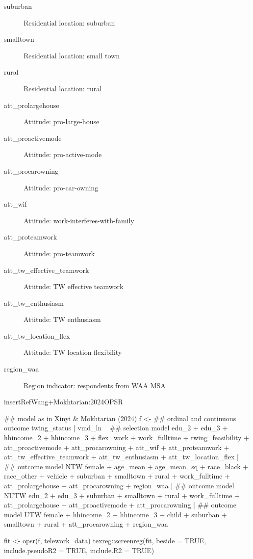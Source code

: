 \documentclass[letterpaper]{book}
\begin{document}
\begin{Format}
\begin{description}
\item[suburban] Residential location: suburban
\item[smalltown] Residential location: small town
\item[rural] Residential location: rural
\item[att\_prolargehouse] Attitude: pro-large-house
\item[att\_proactivemode] Attitude: pro-active-mode
\item[att\_procarowning] Attitude: pro-car-owning
\item[att\_wif] Attitude: work-interferes-with-family
\item[att\_proteamwork] Attitude: pro-teamwork
\item[att\_tw\_effective\_teamwork] Attitude: TW effective teamwork
\item[att\_tw\_enthusiasm] Attitude: TW enthusiasm
\item[att\_tw\_location\_flex] Attitude: TW location flexibility
\item[region\_waa] Region indicator: respondents from WAA MSA

\end{description}

\end{Format}
%
\begin{References}
\bsl{}insertRefWang+Mokhtarian:2024OPSR
\end{References}
%
\begin{Examples}
\begin{ExampleCode}


## model as in Xinyi & Mokhtarian (2024)
f <-
  ## ordinal and continuous outcome
  twing_status | vmd_ln ~
  ## selection model
  edu_2 + edu_3 + hhincome_2 + hhincome_3 +
  flex_work + work_fulltime + twing_feasibility +
  att_proactivemode + att_procarowning +
  att_wif + att_proteamwork +
  att_tw_effective_teamwork + att_tw_enthusiasm + att_tw_location_flex |
  ## outcome model NTW
  female + age_mean + age_mean_sq +
  race_black + race_other +
  vehicle + suburban + smalltown + rural +
  work_fulltime +
  att_prolargehouse + att_procarowning +
  region_waa |
  ## outcome model NUTW
  edu_2 + edu_3 + suburban + smalltown + rural +
  work_fulltime +
  att_prolargehouse + att_proactivemode + att_procarowning |
  ## outcome model UTW
  female + hhincome_2 + hhincome_3 +
  child + suburban + smalltown + rural +
  att_procarowning +
  region_waa

fit <- opsr(f, telework_data)
texreg::screenreg(fit, beside = TRUE, include.pseudoR2 = TRUE, include.R2 = TRUE)


\end{ExampleCode}
\end{Examples}
\end{document}
